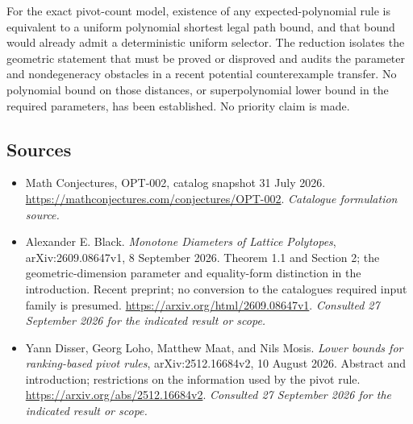 \documentclass[11pt,a4paper]{article}
\numberwithin{equation}{section}
\begin{document}
For the exact pivot-count model, existence of any expected-polynomial
rule is equivalent to a uniform polynomial shortest legal path bound,
and that bound would already admit a deterministic uniform selector.
The reduction isolates the geometric statement that must be proved or
disproved and audits the parameter and nondegeneracy obstacles in a
recent potential counterexample transfer.  No polynomial bound on
those distances, or superpolynomial lower bound in the required
parameters, has been established.  No priority claim is made.
\subsection{Sources}
\begin{itemize}\raggedright
\item[\textnormal{[S1]}]\hypertarget{source:30006742:1}{} Math Conjectures, OPT-002, catalog snapshot 31 July 2026.
\url{https://mathconjectures.com/conjectures/OPT-002}.
{\small\textit{Catalogue formulation source.}}
\item[\textnormal{[E1]}]\hypertarget{extra:30006742:1}{} Alexander E. Black.
\emph{Monotone Diameters of Lattice Polytopes}, arXiv:2609.08647v1, 8 September 2026. Theorem 1.1 and Section 2; the geometric-dimension parameter and equality-form distinction in the introduction. Recent preprint; no conversion to the catalogue\textquotesingle s required input family is presumed.
\url{https://arxiv.org/html/2609.08647v1}.
{\small\textit{Consulted 27 September 2026 for the indicated result or scope.}}
\item[\textnormal{[E2]}]\hypertarget{extra:30006742:2}{} Yann Disser, Georg Loho, Matthew Maat, and Nils Mosis.
\emph{Lower bounds for ranking-based pivot rules}, arXiv:2512.16684v2, 10 August 2026. Abstract and introduction; restrictions on the information used by the pivot rule.
\url{https://arxiv.org/abs/2512.16684v2}.
{\small\textit{Consulted 27 September 2026 for the indicated result or scope.}}
\end{itemize}
\end{document}
